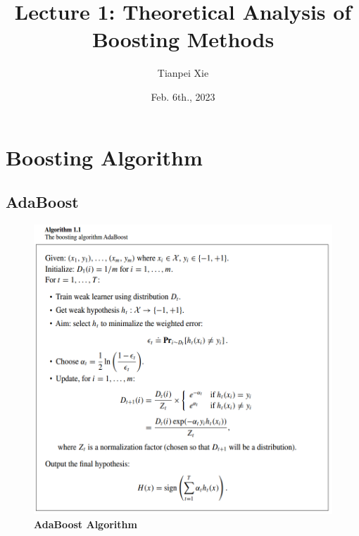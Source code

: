 \documentclass[11pt]{article}
\begin{document}
\title{Lecture 1:  Theoretical Analysis of Boosting Methods}
\author{ Tianpei Xie}
\date{Feb. 6th., 2023}
\maketitle
\tableofcontents
\newpage
\section{Boosting Algorithm}
\subsection{AdaBoost}
\begin{figure}
\begin{minipage}[t]{1\linewidth}
  \centering
  \centerline{\includegraphics[scale = 0.4]{adaboost.png}}
\end{minipage}
\caption{\footnotesize{\textbf{AdaBoost Algorithm \citep{schapire2012boosting}}}}
\label{fig: adaboost}
\end{figure}
\end{document}
